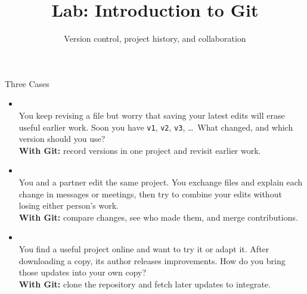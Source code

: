 \newcommand{\CourseTemplatePath}{../../../../../templates/slides/}

\title[Git]{Lab: Introduction to Git}
\subtitle{Version control, project history, and collaboration}

\makecoursetitle

\begin{frame}{Three Cases}
\begin{itemize}
\item {}\\
You keep revising a file but worry that saving your latest edits will erase useful earlier work. Soon you have \texttt{v1}, \texttt{v2}, \texttt{v3}, \ldots\ What changed, and which version should you use?\\
\textbf{With Git:} record versions in one project and revisit earlier work.
\medskip
\item {}\\
You and a partner edit the same project. You exchange files and explain each change in messages or meetings, then try to combine your edits without losing either person's work.\\
\textbf{With Git:} compare changes, see who made them, and merge contributions.
\medskip
\item {}\\
You find a useful project online and want to try it or adapt it. After downloading a copy, its author releases improvements. How do you bring those updates into your own copy?\\
\textbf{With Git:} clone the repository and fetch later updates to integrate.
\end{itemize}
\end{frame}

